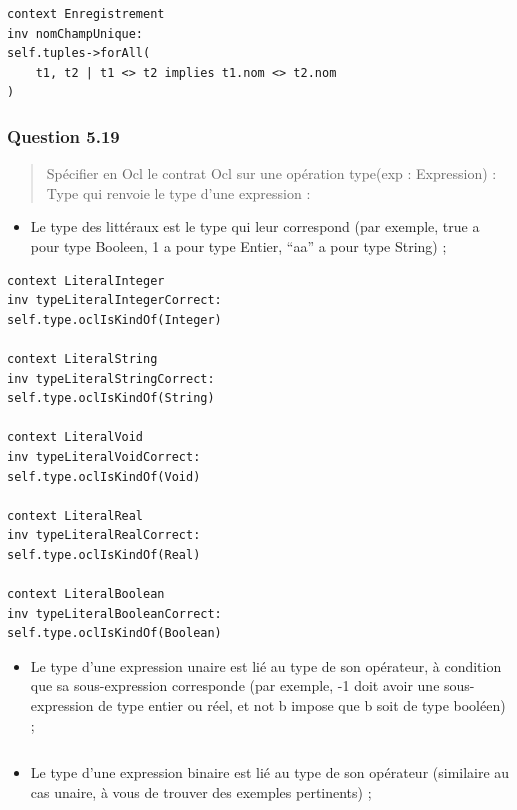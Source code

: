 \documentclass[]{article}
\providecommand{\tightlist}{%
  \setlength{\itemsep}{0pt}\setlength{\parskip}{0pt}}
\begin{document}
\begin{verbatim}
context Enregistrement
inv nomChampUnique:
self.tuples->forAll(
    t1, t2 | t1 <> t2 implies t1.nom <> t2.nom
)
\end{verbatim}

\hypertarget{question-5.19}{%
\subsubsection{Question 5.19}\label{question-5.19}}

\begin{quote}
Spécifier en Ocl le contrat Ocl sur une opération type(exp : Expression)
: Type qui renvoie le type d'une expression :
\end{quote}

\begin{itemize}
\tightlist
\item
  Le type des littéraux est le type qui leur correspond (par exemple,
  true a pour type Booleen, 1 a pour type Entier, ``aa'' a pour type
  String) ;
\end{itemize}

\begin{verbatim}
context LiteralInteger
inv typeLiteralIntegerCorrect:
self.type.oclIsKindOf(Integer)

context LiteralString
inv typeLiteralStringCorrect:
self.type.oclIsKindOf(String)

context LiteralVoid
inv typeLiteralVoidCorrect:
self.type.oclIsKindOf(Void)

context LiteralReal
inv typeLiteralRealCorrect:
self.type.oclIsKindOf(Real)

context LiteralBoolean
inv typeLiteralBooleanCorrect:
self.type.oclIsKindOf(Boolean)

\end{verbatim}

\begin{itemize}
\tightlist
\item
  Le type d'une expression unaire est lié au type de son opérateur, à
  condition que sa sous-expression corresponde (par exemple, -1 doit
  avoir une sous-expression de type entier ou réel, et not b impose que
  b soit de type booléen) ;
\end{itemize}

\begin{verbatim}
\end{verbatim}

\begin{itemize}
\tightlist
\item
  Le type d'une expression binaire est lié au type de son opérateur
  (similaire au cas unaire, à vous de trouver des exemples pertinents) ;
\end{itemize}
\end{document}
